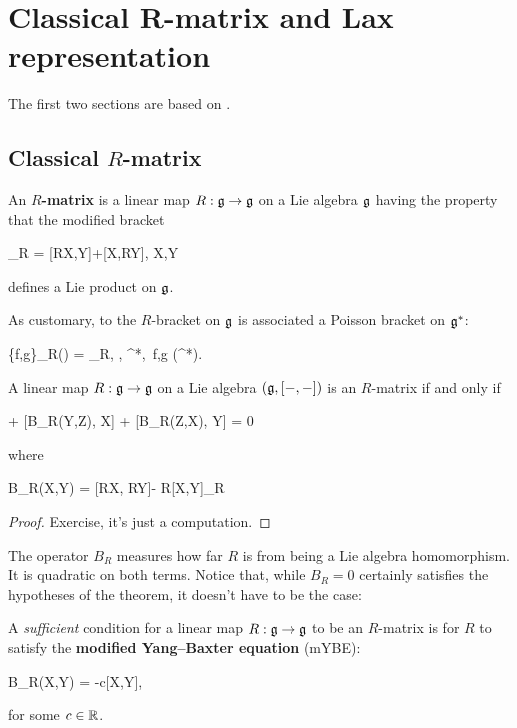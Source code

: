 \documentclass[main.tex]{subfiles}
\begin{document}
\chapter{Classical R-matrix and Lax representation}
The first two sections are based on \cite[Section 3]{oevel1989r}.

\section[Classical R-matrix]{Classical $R$-matrix}
\begin{definition}
	An \textbf{$R$-matrix} is a linear map $R: \mathfrak g \to \mathfrak g$ on a Lie algebra $\mathfrak g$ having the property that the modified bracket
	\begin{eqalign}
		[X,Y]_R = [RX,Y]+[X,RY], \quad \forall X,Y \in \lalg
	\end{eqalign}
	defines a Lie product on $\mathfrak g$.
\end{definition}

As customary, to the $R$-bracket on $\mathfrak g$ is associated a Poisson bracket on $\mathfrak g^*$:
\begin{eqalign}
	\{f,g\}_R(\xi) = \langle [df, dg]_R, \xi \rangle, \quad \forall \xi \in \lalg^*,\, \forall f,g \in \Cinfty(\lalg^*).
\end{eqalign}

\begin{proposition}
	A linear map $R: \mathfrak g \to \mathfrak g$ on a Lie algebra $(\mathfrak g, [-,-])$ is an $R$-matrix if and only if
	\begin{eqalign}
		[B_R(X,Y), Z] + [B_R(Y,Z), X] + [B_R(Z,X), Y] = 0
	\end{eqalign}
	where
	\begin{eqalign}
		B_R(X,Y) = [RX, RY]- R[X,Y]_R
	\end{eqalign}
\end{proposition}
\begin{proof}
	Exercise, it's just a computation.
\end{proof}

The operator $B_R$ measures how far $R$ is from being a Lie algebra homomorphism. It is quadratic on both terms. Notice that, while $B_R = 0$ certainly satisfies the hypotheses of the theorem, it doesn't have to be the case:

\begin{corollary}
	A \emph{sufficient} condition for a linear map $R: \mathfrak g \to \mathfrak g$ to be an $R$-matrix is for $R$ to satisfy the \textbf{modified Yang--Baxter equation} (mYBE):
	\begin{eqalign}
		B_R(X,Y) = -c[X,Y],
	\end{eqalign}
	for some $c \in \mathbb{R}$.
\end{corollary}
\end{document}
